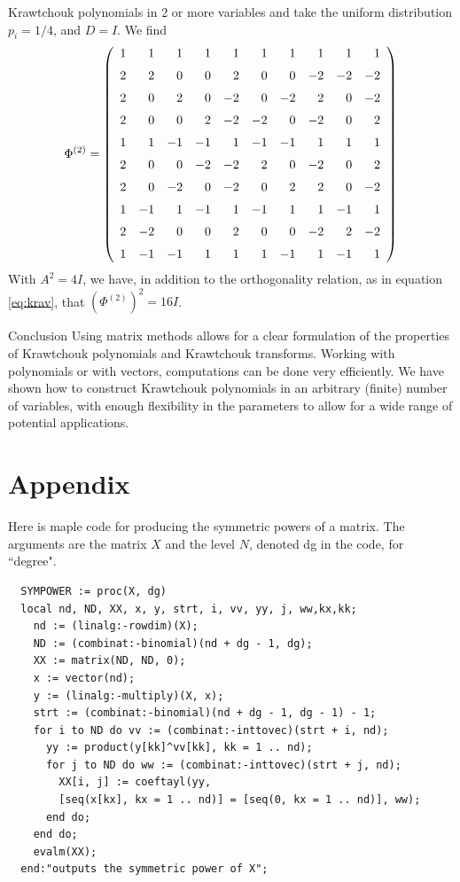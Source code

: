 \documentclass[runningheads]{llncs}
\begin{document}
\begin{section}{Krawtchouk polynomials in 2 or more variables}
and take the uniform distribution $p_i=1/4$, and $D=I$. We find
$$\Phi^{(2)}= \left( \begin {array}{rrrrrrrrrr} 1&1&1&1&1&1&1&1&1&1
\\\noalign{\medskip}2&2&0&0&2&0&0&-2&-2&-2\\\noalign{\medskip}2&0&2&0&
-2&0&-2&2&0&-2\\\noalign{\medskip}2&0&0&2&-2&-2&0&-2&0&2
\\\noalign{\medskip}1&1&-1&-1&1&-1&-1&1&1&1\\\noalign{\medskip}2&0&0&-
2&-2&2&0&-2&0&2\\\noalign{\medskip}2&0&-2&0&-2&0&2&2&0&-2
\\\noalign{\medskip}1&-1&1&-1&1&-1&1&1&-1&1\\\noalign{\medskip}2&-2&0&0
&2&0&0&-2&2&-2\\\noalign{\medskip}1&-1&-1&1&1&1&-1&1&-1&1\end {array} \right)$$
With $A^2=4I$, we have, in addition to the orthogonality relation, as in equation \eqref{eq:krav}, that $(\Phi^{(2)})^2=16I$.
\end{section}

\begin{section}{Conclusion}
Using matrix methods allows for a clear formulation of the properties of Krawtchouk polynomials and
Krawtchouk transforms. Working with polynomials or with vectors, computations can be done very
efficiently. We have shown how to construct Krawtchouk polynomials in an arbitrary (finite) number of variables,
with enough flexibility in the parameters to allow for a wide range of potential applications.
\end{section}

\section{Appendix}
Here is maple code for producing the symmetric powers of a matrix.
The arguments are the matrix $X$ and the level $N$, denoted dg in the code, for ``degree".

\begin{verbatim}
  SYMPOWER := proc(X, dg)
  local nd, ND, XX, x, y, strt, i, vv, yy, j, ww,kx,kk;
    nd := (linalg:-rowdim)(X);
    ND := (combinat:-binomial)(nd + dg - 1, dg);
    XX := matrix(ND, ND, 0);
    x := vector(nd);
    y := (linalg:-multiply)(X, x);
    strt := (combinat:-binomial)(nd + dg - 1, dg - 1) - 1;
    for i to ND do vv := (combinat:-inttovec)(strt + i, nd);
      yy := product(y[kk]^vv[kk], kk = 1 .. nd);
      for j to ND do ww := (combinat:-inttovec)(strt + j, nd);
        XX[i, j] := coeftayl(yy, 
        [seq(x[kx], kx = 1 .. nd)] = [seq(0, kx = 1 .. nd)], ww);
      end do;
    end do;
    evalm(XX);
  end:"outputs the symmetric power of X";
\end{verbatim}
\end{document}
